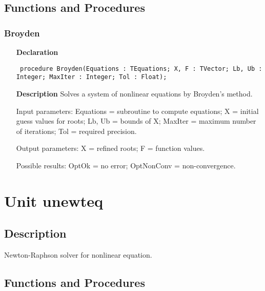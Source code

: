 \documentclass[12pt,a4paper,oneside]{report}
\newcommand{\declarationitem}[1]{\textbf{#1}}
\newcommand{\descriptiontitle}[1]{\textbf{#1}}
\newcommand{\code}[1]{\texttt{#1}}
\begin{document}
\subsection{Functions and Procedures}
\subsubsection{Broyden}
\label{ubroyden-Broyden}
\begin{itemize}\item[\declarationitem{Declaration}\hfill]
	\begin{flushleft}
		\code{
			procedure Broyden(Equations : TEquations; X, F : TVector; Lb, Ub : Integer; MaxIter : Integer; Tol : Float);}
		
	\end{flushleft}
	
	\par
	\item[\descriptiontitle{Description}]
	Solves a system of nonlinear equations by Broyden's method.
	
	Input parameters: Equations = subroutine to compute equations; X = initial guess values for roots; Lb, Ub = bounds of X; MaxIter = maximum number of iterations; Tol = required precision.
	
	Output parameters: X = refined roots; F = function values.
	
	Possible results: OptOk = no error; OptNonConv = non{-}convergence.
\end{itemize}
\section{Unit unewteq}
\label{unewteq}
\subsection{Description}
Newton{-}Raphson solver for nonlinear equation.
\subsection{Functions and Procedures}
\end{document}
